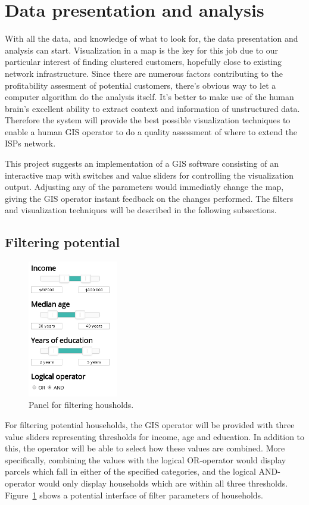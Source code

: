 \documentclass[twocolumn]{article}
\begin{document}
\section{Data presentation and analysis}
\label{sec:Methods}
With all the data, and knowledge of what to look for, the data presentation and analysis can start. Visualization in a map is the key for this job due to our particular interest of finding clustered customers, hopefully close to existing network infrastructure. Since there are numerous factors contributing to the profitability assesment of potential customers, there's obvious way to let a computer algorithm do the analysis itself. It's better to make use of the human brain's excellent ability to extract context and information of unstructured data. Therefore the system will provide the best possible visualization techniques to enable a human GIS operator to do a quality assessment of where to extend the ISPs network.

This project suggests an implementation of a GIS software consisting of an interactive map with switches and value sliders for controlling the visualization output. Adjusting any of the parameters would immediatly change the map, giving the GIS operator instant feedback on the changes performed. The filters and visualization techniques will be described in the following subsections.

\subsection{Filtering potential}
\label{sub:Filtering potential}
\begin{figure}
  \centering
  \includegraphics[width=0.35\textwidth]{img/household.png}
  \caption{Panel for filtering housholds.}
  \label{fig:household}
\end{figure}
For filtering potential households, the GIS operator will be provided with three value sliders representing thresholds for income, age and education. In addition to this, the operator will be able to select how these values are combined. More specifically, combining the values with the logical OR-operator would display parcels which fall in either of the specified categories, and the logical AND-operator would only display households which are within all three thresholds. Figure~\ref{fig:household} shows a potential interface of filter parameters of households.
\end{document}
